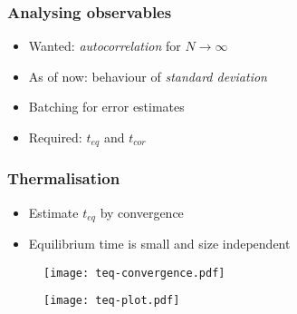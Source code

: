 

\begin{frame}
    \frametitle{Analysing observables}

    \begin{itemize}
        \item Wanted: \emph{autocorrelation} for $N \rightarrow \infty$ \\[3mm]
        \item As of now: behaviour of \emph{standard deviation}
        \item Batching for error estimates
        \item Required: $t_{eq}$ and $t_{cor}$
    \end{itemize}
\end{frame}

\begin{frame}
    \frametitle{Thermalisation}

    \begin{itemize}
        \item Estimate $t_{eq}$ by convergence \\[3mm]
        \item Equilibrium time is small and size independent %
    \end{itemize}
    \begin{figure}[b]
        \centering
        \begin{minipage}{0.49\linewidth}
            \centering
            \texttt{[image: teq-convergence.pdf]}
        \end{minipage}
        \hfill
        \begin{minipage}{0.49\linewidth}
            \centering
            \texttt{[image: teq-plot.pdf]}
        \end{minipage}
    \end{figure}
\end{frame}

